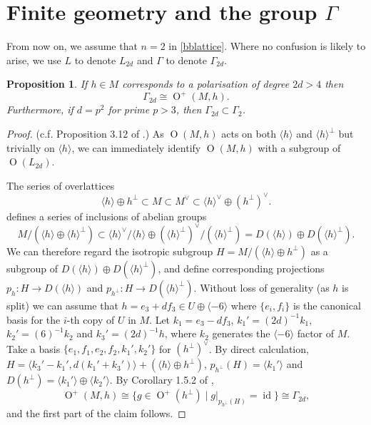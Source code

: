 \documentclass[11pt]{article}
\newtheorem{prop}[thm]{Proposition}
\newcommand{\la}{\langle}
\newcommand{\ra}{\rangle}
\newcommand{\opn}{\operatorname}
\newcommand{\op}{\oplus}
\newcommand{\beq}{\begin{equation*}}
\newcommand{\eeq}{\end{equation*}}
\begin{document}
\section{Finite geometry and the group $\Gamma$}
From now on, we assume that $n=2$ in \eqref{bblattice}.
Where no confusion is likely to arise, we use $L$ to denote $L_{2d}$ and $\Gamma$ to denote $\Gamma_{2d}$.
\begin{prop}\label{modgprop}
  If $h \in M$ corresponds to a polarisation of degree $2d>4$ then
  \beq
  \Gamma_{2d} \cong \opn{O}^+(M, h).
  \eeq
Furthermore, if $d=p^2$ for prime $p>3$, then
  $\Gamma_{2d} \subset \Gamma_2$.
\end{prop}
\begin{proof}
  (c.f. Proposition 3.12 of \cite{handbook}.)
  As $\opn{O}(M, h)$ acts on both $\la h \ra$ and $\la h \ra^{\perp}$ but trivially on $\la h \ra$, we can immediately identify $\opn{O}(M, h)$ with a subgroup of $\opn{O}(L_{2d})$.

  The series of overlattices
  \beq
  \la h \ra \op h^{\perp} \subset M \subset M^{\vee} \subset \la h \ra^{\vee} \op (h^{\perp})^{\vee}.
  \eeq
  defines a series of inclusions of abelian groups
  \beq
  M/( \la h \ra \op \la h \ra^{\perp} )
  \subset
  \la h \ra^{\vee}/ \la h \ra \op (\la h \ra^{\perp})^{\vee} / ( \la h \ra^{\perp} )
  =
  D(\la h \ra) \op D(\la h \ra^{\perp} ).
  \eeq
  We can therefore regard the isotropic subgroup $H = M / ( \la h \ra \op h^{\perp} )$ as a subgroup of $D(\la h \ra) \op D(\la h \ra^{\perp})$, and define  corresponding projections
  $p_h:H \rightarrow D(\la h \ra)$ and
  $p_{h^{\perp}}:H \rightarrow D(\la h \ra^{\perp})$.
  Without loss of generality (as $h$ is split)  we can assume that $h = e_3 + df_3 \in U \op \la -6 \ra$ where $\{e_i, f_i \}$ is the canonical basis for the $i$-th copy of $U$ in $M$.
  Let
  $k_1 = e_3 - df_3$,
  $k_1' = (2d)^{-1} k_1$,
  $k_2' = (6)^{-1}k_2$ and
  $k_3' = (2d)^{-1} h$,
  where $k_2$ generates the $\la -6 \ra$ factor of $M$.
  Take a basis $\{e_1, f_1, e_2, f_2, k_1', k_2' \}$ for $(h^{\perp})^{\vee}$.
  By direct calculation,
  $H = \la k_3' - k_1', d(k_1' + k_3') \ra + (\la h \ra \op h^{\perp} )$,
  $p_{h^{\perp}}(H) = \la k_1' \ra$ and
  $D(h^{\perp}) = \la k_1' \ra \op \la k_2 ' \ra$.
  By Corollary 1.5.2 of \cite{Nikulin},
  \beq
  \opn{O}^+(M, h) \cong \{ g \in \opn{O}^+(h^{\perp}) \mid g \vert_{p_{h^{\perp}}(H)} = \opn{id} \}
  \cong \Gamma_{2d}, 
  \eeq
  and the first part of the claim follows.


\end{proof}
\end{document}
